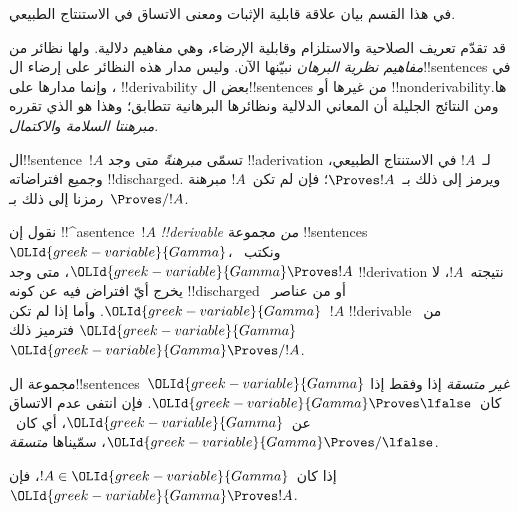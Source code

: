 \documentclass[../../../include/open-logic-section]{subfiles}
\begin{document}
      {}
      {}


\begin{editorial}
في هذا القسم بيان علاقة قابلية الإثبات ومعنى الاتساق في الاستنتاج
الطبيعي.
\end{editorial}

\begin{explain}
قد تقدّم تعريف الصلاحية والاستلزام وقابلية الإرضاء، وهي مفاهيم دلالية.
ولها نظائر من \emph{مفاهيم نظرية البرهان} نبيّنها الآن. وليس مدار هذه
النظائر على إرضاء ال!!{sentence}s في
، وإنما مدارها على
!!{derivability} بعض ال!!{sentence}s من غيرها أو !!{nonderivability}ها.
ومن النتائج الجليلة أن المعاني الدلالية ونظائرها البرهانية تتطابق؛
وهذا هو الذي تقرره \emph{مبرهنتا السلامة} و\emph{الاكتمال}.
\end{explain}


\begin{defn}[المبرهنات]
ال!!{sentence}~$!A$ تسمّى \emph{مبرهنةً} متى وجد !!a{derivation} لـ~$!A$
في الاستنتاج الطبيعي، وجميع افتراضاته !!{discharged}. ويرمز إلى ذلك
بـ~$\Proves !A$؛ فإن لم تكن~$!A$ مبرهنة رمزنا إلى ذلك بـ~$\Proves/ !A$.
\end{defn}

\begin{defn}[!!^{derivability}]
نقول إن !!^a{sentence}~$!A$ \emph{!!{derivable} من} مجموعة
!!{sentence}s~$\OLId{greek-variable}{Gamma}$، ونكتب~$\OLId{greek-variable}{Gamma} \Proves !A$، متى وجد
!!{derivation} نتيجته~$!A$، لا يخرج أيّ افتراض فيه عن كونه
!!{discharged} أو من عناصر~$\OLId{greek-variable}{Gamma}$. وأما إذا لم تكن~$!A$
!!{derivable} من~$\OLId{greek-variable}{Gamma}$ فترميز ذلك~$\OLId{greek-variable}{Gamma} \Proves/ !A$.
\end{defn}

\begin{defn}[الاتساق]
مجموعة ال!!{sentence}s~$\OLId{greek-variable}{Gamma}$ \emph{غير متسقة} إذا وفقط إذا
كان~$\OLId{greek-variable}{Gamma} \Proves \lfalse$. فإن انتفى عدم الاتساق عن~$\OLId{greek-variable}{Gamma}$،
أي كان~$\OLId{greek-variable}{Gamma} \Proves/ \lfalse$، سمّيناها \emph{متسقة}.
\end{defn}

\begin{prop}[الانعكاسية]
إذا كان~$!A \in \OLId{greek-variable}{Gamma}$، فإن~$\OLId{greek-variable}{Gamma} \Proves !A$.
\end{prop}
\end{document}
